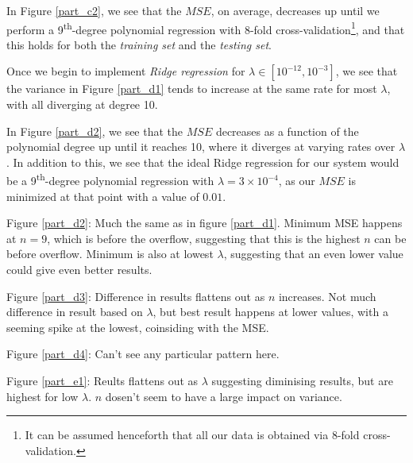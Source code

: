 \documentclass[a4paper,10pt,english]{article}
\begin{document}

In Figure \ref{part_c2}, we see that the $MSE$, on average, decreases up until we perform a 9\textsuperscript{th}-degree polynomial regression with 8-fold cross-validation\footnote{It can be assumed henceforth that all our data is obtained via 8-fold cross-validation.}, and that this holds for both the \textit{training set} and the \textit{testing set}.


Once we begin to implement \textit{Ridge regression} for $\lambda \in [10^{-12}, 10^{-3}]$, we see that the variance in Figure \ref{part_d1} tends to increase at the same rate for most $\lambda$, with all diverging at degree 10.


In Figure \ref{part_d2}, we see that the $MSE$ decreases as a function of the polynomial degree up until it reaches 10, where it diverges at varying rates over $\lambda$.  In addition to this, we see that the ideal Ridge regression for our system would be a 9\textsuperscript{th}-degree polynomial regression with $\lambda = 3 \times 10^{-4}$, as our $MSE$ is minimized at that point with a value of $0.01$.


Figure \ref{part_d2}: Much the same as in figure \ref{part_d1}. Minimum MSE happens at $n=9$, which is before the overflow, suggesting that this is the highest $n$ can be before overflow. Minimum is also at lowest $\lambda$, suggesting that an even lower value could give even better results.

Figure \ref{part_d3}: Difference in results flattens out as $n$ increases. Not much difference in result based on $\lambda$, but best result happens at lower values, with a seeming spike at the lowest, coinsiding with the MSE. 

Figure \ref{part_d4}: Can't see any particular pattern here.

Figure \ref{part_e1}: Reults flattens out as $\lambda$ suggesting diminising results, but are highest for low $\lambda$. $n$ dosen't seem to have a large impact on variance.
\end{document}
